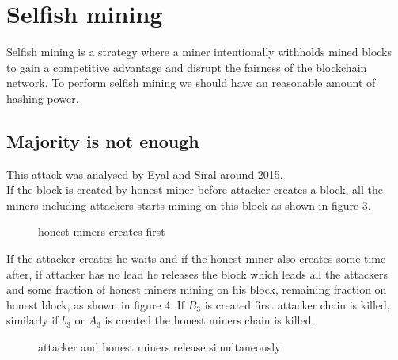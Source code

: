 \documentclass{article}
\begin{document}
\section{Selfish mining}
Selfish mining is a strategy where a miner intentionally withholds mined blocks to gain a competitive advantage and disrupt the fairness of the blockchain network. To perform selfish mining we should have an reasonable amount of hashing power.
\subsection{Majority is not enough}
This attack was analysed by Eyal and Siral around 2015. \\
If the block is created by honest miner before attacker creates a block, all the miners including attackers starts mining on this block as shown in figure 3.\\
\begin{figure}
\centering
  \caption{honest miners creates first}
\end{figure}
If the attacker creates he waits and if the honest miner also creates some time after, if attacker has no lead he releases the block which leads all the attackers and some fraction of honest miners mining on his block, remaining fraction on honest block, as shown in figure 4.
If $B_3$ is created first attacker chain is killed, similarly if $b_3$ or $A_3$ is created the honest miners chain is killed.\\ 
\begin{figure}
\centering
  \caption{attacker and honest miners release simultaneously}
\end{figure}
\end{document}
